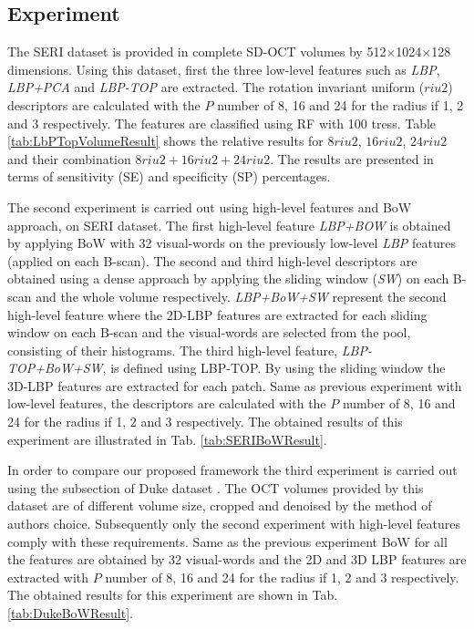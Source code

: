 \subsection{Experiment}
The SERI dataset is provided in complete SD-OCT volumes by 512$\times$1024$\times$128 dimensions. Using this dataset, first the three low-level features such as \textit{LBP}, \textit{LBP+PCA} and \textit{LBP-TOP} are extracted. The rotation invariant uniform ($riu2$) descriptors are calculated with the $P$ number of 8, 16 and 24 for the radius if 1, 2 and 3 respectively. The features are classified using RF with 100 tress. Table \ref{tab:LbPTopVolumeResult} shows the relative results for $8riu2$, $16riu2$, $24riu2$ and their combination $8riu2 + 16riu2 + 24riu2$. The results are presented in terms of sensitivity (SE) and specificity (SP) percentages.  

The second experiment is carried out using high-level features and BoW approach, on SERI dataset. The first high-level feature \textit{LBP+BOW} is obtained by applying BoW with 32 visual-words on the previously low-level \textit{LBP} features (applied on each B-scan). The second and third high-level descriptors are obtained using a dense approach by applying the sliding window (\textit{SW}) on each B-scan and the whole volume respectively. \textit{LBP+BoW+SW} represent the second high-level feature where the 2D-LBP features are extracted for each sliding window on each B-scan and the visual-words are selected from the pool, consisting of their histograms. The third high-level feature, \textit{LBP-TOP+BoW+SW}, is defined using LBP-TOP. By using the sliding window the 3D-LBP features are extracted for each patch. Same as previous experiment with low-level features, the descriptors are calculated with the $P$ number of 8, 16 and 24 for the radius if 1, 2 and 3 respectively. The obtained results of this experiment are illustrated in Tab. \ref{tab:SERIBoWResult}. 

In order to compare our proposed framework the third experiment is carried out using the subsection of Duke dataset \citep{Srinivasan2014}. The OCT volumes provided by this dataset are of different volume size, cropped and denoised by the method of authors choice. Subsequently only the second experiment with high-level features comply with these requirements. Same as the previous experiment BoW for all the features are obtained by 32 visual-words and the 2D and 3D LBP features are extracted with $P$ number of 8, 16 and 24 for the radius if 1, 2 and 3 respectively. The obtained results for this experiment are shown in Tab. \ref{tab:DukeBoWResult}.

